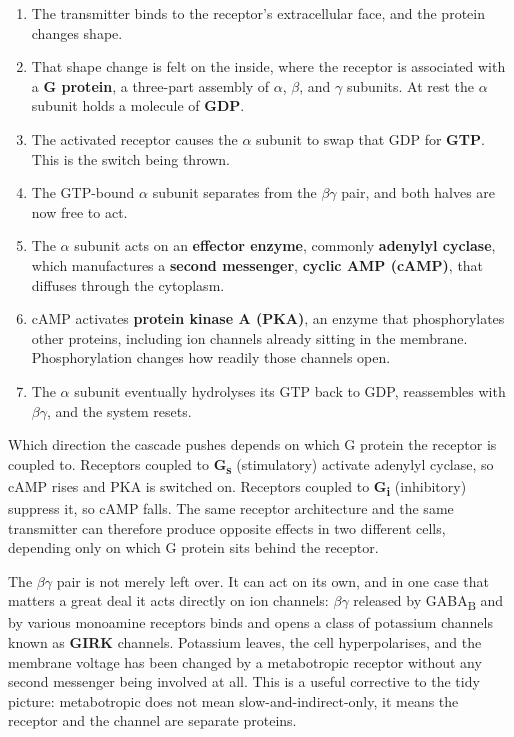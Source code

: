 \documentclass[11pt]{article}
\begin{document}
\begin{enumerate}
    \item The transmitter binds to the receptor's extracellular face, and the protein changes shape.
    \item That shape change is felt on the inside, where the receptor is associated with a \textbf{G protein}, a three-part assembly of $\alpha$, $\beta$, and $\gamma$ subunits. At rest the $\alpha$ subunit holds a molecule of \textbf{GDP}.
    \item The activated receptor causes the $\alpha$ subunit to swap that GDP for \textbf{GTP}. This is the switch being thrown.
    \item The GTP-bound $\alpha$ subunit separates from the $\beta\gamma$ pair, and both halves are now free to act.
    \item The $\alpha$ subunit acts on an \textbf{effector enzyme}, commonly \textbf{adenylyl cyclase}, which manufactures a \textbf{second messenger}, \textbf{cyclic AMP (cAMP)}, that diffuses through the cytoplasm.
    \item cAMP activates \textbf{protein kinase A (PKA)}, an enzyme that phosphorylates other proteins, including ion channels already sitting in the membrane. Phosphorylation changes how readily those channels open.
    \item The $\alpha$ subunit eventually hydrolyses its GTP back to GDP, reassembles with $\beta\gamma$, and the system resets.
\end{enumerate}

Which direction the cascade pushes depends on which G protein the receptor is coupled to. Receptors coupled to \textbf{G\textsubscript{s}} (stimulatory) activate adenylyl cyclase, so cAMP rises and PKA is switched on. Receptors coupled to \textbf{G\textsubscript{i}} (inhibitory) suppress it, so cAMP falls. The same receptor architecture and the same transmitter can therefore produce opposite effects in two different cells, depending only on which G protein sits behind the receptor.

The $\beta\gamma$ pair is not merely left over. It can act on its own, and in one case that matters a great deal it acts directly on ion channels: $\beta\gamma$ released by GABA\textsubscript{B} and by various monoamine receptors binds and opens a class of potassium channels known as \textbf{GIRK} channels. Potassium leaves, the cell hyperpolarises, and the membrane voltage has been changed by a metabotropic receptor without any second messenger being involved at all. This is a useful corrective to the tidy picture: metabotropic does not mean slow-and-indirect-only, it means the receptor and the channel are separate proteins.
\end{document}
